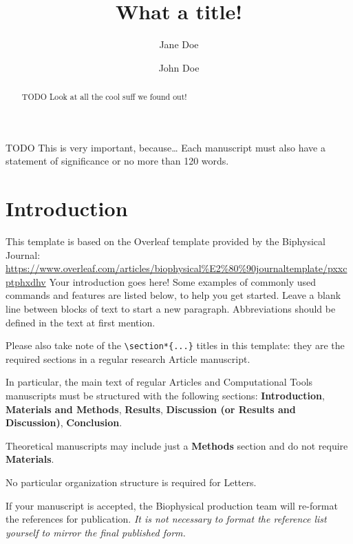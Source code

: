 \documentclass[
  twocolumn]{biophys-new-mod}
\title{What a title!}
\author[1,2,*]
  {Jane Doe}
\author[1]
  {John Doe}
\affil[1]{Institute for Cool Things}
\affil[2]{University of Awesome Research}
\begin{document}
\begin{frontmatter}

\begin{abstract}
TODO Look at all the cool suff we found out!
\end{abstract}


\begin{sigstatement}
TODO This is very important, because\ldots{} Each manuscript must also
have a statement of significance or no more than 120 words.
\end{sigstatement}


\end{frontmatter}\ifdefined\Shaded\renewenvironment{Shaded}{\begin{tcolorbox}[frame hidden, interior hidden, borderline west={3pt}{0pt}{shadecolor}, breakable, sharp corners, boxrule=0pt, enhanced]}{\end{tcolorbox}}\fi

\hypertarget{introduction}{%
\section{Introduction}\label{introduction}}

This template is based on the Overleaf template provided by the
Biphysical Journal:
\url{https://www.overleaf.com/articles/biophysical\%E2\%80\%90journaltemplate/pxxcptphxdhv}
Your introduction goes here! Some examples of commonly used commands and
features are listed below, to help you get started. Leave a blank line
between blocks of text to start a new paragraph. Abbreviations should be
defined in the text at first mention.

Please also take note of the \texttt{\textbackslash{}section*\{...\}}
titles in this template: they are the required sections in a regular
research Article manuscript.

In particular, the main text of regular Articles and Computational Tools
manuscripts must be structured with the following sections:
\textbf{Introduction}, \textbf{Materials and Methods}, \textbf{Results},
\textbf{Discussion (or Results and Discussion)}, \textbf{Conclusion}.

Theoretical manuscripts may include just a \textbf{Methods} section and
do not require \textbf{Materials}.

No particular organization structure is required for Letters.

If your manuscript is accepted, the Biophysical production team will
re-format the references for publication. \emph{It is not necessary to
format the reference list yourself to mirror the final published form.}
\end{document}
